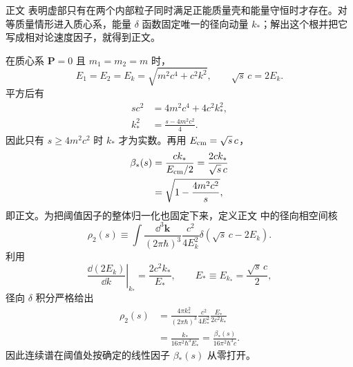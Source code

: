 

\begin{derivation}

正文 表明虚部只有在两个内部粒子同时满足正能质量壳和能量守恒时才存在。对等质量情形进入质心系，能量 $\delta$ 函数固定唯一的径向动量 $k_*$；解出这个根并把它写成相对论速度因子，就得到正文。

在质心系 $\mathbf P=0$ 且 $m_1=m_2=m$ 时，
\begin{equation*}
 E_1=E_2=E_k=\sqrt{m^2c^4+c^2k^2},
 \qquad
 \sqrt{s}\,c=2E_k.
\end{equation*}
平方后有
\begin{align*}
 sc^2
 &=4m^2c^4+4c^2k_*^2,\\
 k_*^2
 &=\frac{s-4m^2c^2}{4}.
\end{align*}
因此只有 $s\ge4m^2c^2$ 时 $k_*$ 才为实数。再用 $E_{\rm cm}=\sqrt{s}\,c$，
\begin{align*}
 \beta_*(s)
 &=\frac{ck_*}{E_{\rm cm}/2}
 =\frac{2ck_*}{\sqrt{s}\,c}\\
 &=\sqrt{1-\frac{4m^2c^2}{s}},
\end{align*}
即正文。为把阈值因子的整体归一化也固定下来，定义正文 中的径向相空间核
\begin{equation*}
 \rho_2(s)
 \equiv
 \int\frac{\dd^3\mathbf k}{(2\pi\hbar)^3}
 \frac{c^2}{4E_k^2}
 \delta\!\left(\sqrt{s}\,c-2E_k\right).
\end{equation*}
利用
\begin{equation*}
 \left.\frac{\dd(2E_k)}{\dd k}\right|_{k_*}
 =\frac{2c^2k_*}{E_*},
 \qquad E_*\equiv E_{k_*}=\frac{\sqrt{s}\,c}{2},
\end{equation*}
径向 $\delta$ 积分严格给出
\begin{align*}
 \rho_2(s)
 &=\frac{4\pi k_*^2}{(2\pi\hbar)^3}
 \frac{c^2}{4E_*^2}
 \frac{E_*}{2c^2k_*}\\
 &=\frac{k_*}{16\pi^2\hbar^3E_*}
 =\frac{\beta_*(s)}{16\pi^2\hbar^3c}.
\end{align*}
因此连续谱在阈值处按确定的线性因子 $\beta_*(s)$ 从零打开。
\end{derivation}

